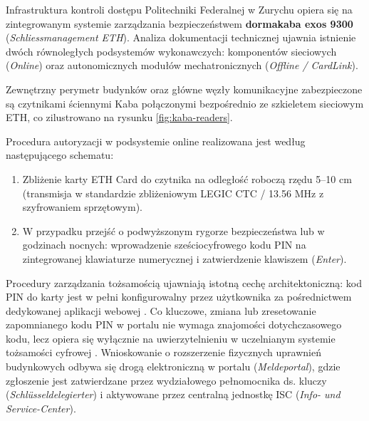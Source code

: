 

Infrastruktura kontroli dostępu Politechniki Federalnej w Zurychu opiera się na zintegrowanym systemie zarządzania bezpieczeństwem \textbf{dormakaba exos 9300} (\textit{Schliessmanagement ETH}). Analiza dokumentacji technicznej ujawnia istnienie dwóch równoległych podsystemów wykonawczych: komponentów sieciowych (\textit{Online}) oraz autonomicznych modułów mechatronicznych (\textit{Offline / CardLink}).


Zewnętrzny perymetr budynków oraz główne węzły komunikacyjne zabezpieczone są czytnikami ściennymi Kaba połączonymi bezpośrednio ze szkieletem sieciowym ETH, co zilustrowano na rysunku \ref{fig:kaba-readers}.


Procedura autoryzacji w podsystemie online realizowana jest według następującego schematu:
\begin{enumerate}
    \item Zbliżenie karty ETH Card do czytnika na odległość roboczą rzędu 5--10 cm (transmisja w standardzie zbliżeniowym LEGIC CTC / 13.56 MHz z szyfrowaniem sprzętowym).
    \item W przypadku przejść o podwyższonym rygorze bezpieczeństwa lub w godzinach nocnych: wprowadzenie sześciocyfrowego kodu PIN na zintegrowanej klawiaturze numerycznej i zatwierdzenie klawiszem  (\textit{Enter}).
\end{enumerate}

Procedury zarządzania tożsamością ujawniają istotną cechę architektoniczną: kod PIN do karty jest w pełni konfigurowalny przez użytkownika za pośrednictwem dedykowanej aplikacji webowej . Co kluczowe, zmiana lub zresetowanie zapomnianego kodu PIN w portalu nie wymaga znajomości dotychczasowego kodu, lecz opiera się wyłącznie na uwierzytelnieniu w uczelnianym systemie tożsamości cyfrowej . Wnioskowanie o rozszerzenie fizycznych uprawnień budynkowych odbywa się drogą elektroniczną w portalu  (\textit{Meldeportal}), gdzie zgłoszenie jest zatwierdzane przez wydziałowego pełnomocnika ds. kluczy (\textit{Schlüsseldelegierter}) i aktywowane przez centralną jednostkę ISC (\textit{Info- und Service-Center}).


